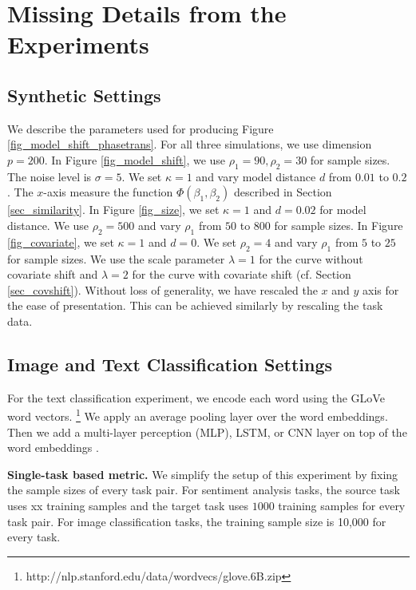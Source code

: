 \section{Missing Details from the Experiments}\label{app_experiments}


\subsection{Synthetic Settings}\label{app_synthetic}
	We describe the parameters used for producing Figure \ref{fig_model_shift_phasetrans}.
	For all three simulations, we use dimension $p = 200$.
	In Figure \ref{fig_model_shift}, we use $\rho_1 = 90, \rho_2 = 30$ for sample sizes.
	The noise level is $\sigma = 5$.
	We set $\kappa = 1$ and vary model distance $d$ from $0.01$ to $0.2$.
	The $x$-axis measure the function $\Phi(\beta_1, \beta_2)$ described in Section \ref{sec_similarity}.
	In Figure \ref{fig_size}, we set $\kappa = 1$ and $d = 0.02$ for model distance.
	We use $\rho_2 = 500$ and vary $\rho_1$ from $50$ to $800$ for sample sizes.
	In Figure \ref{fig_covariate}, we set $\kappa = 1$ and $d = 0$.
	We set $\rho_2 = 4$ and vary $\rho_1$ from $5$ to $25$ for sample sizes.
	We use the scale parameter $\lambda = 1$ for the curve without covariate shift and $\lambda = 2$ for the curve with covariate shift (cf. Section \ref{sec_covshift}).
	Without loss of generality, we have rescaled the $x$ and $y$ axis for the ease of presentation.
	This can be achieved similarly by rescaling the task data.

\subsection{Image and Text Classification Settings}\label{app_it}

For the text classification experiment, we encode each word using the GLoVe word vectors.
\footnote{http://nlp.stanford.edu/data/wordvecs/glove.6B.zip}
We apply an average pooling layer over the word embeddings.
Then we add a multi-layer perception (MLP), LSTM, or CNN layer on top of the word embeddings \cite{lei2018simple}.

\textbf{Single-task based metric.}
We simplify the setup of this experiment by fixing the sample sizes of every task pair.
For sentiment analysis tasks, the source task uses xx training samples and the target task uses $1000$ training samples for every task pair.
For image classification tasks, the training sample size is 10,000 for every task.

